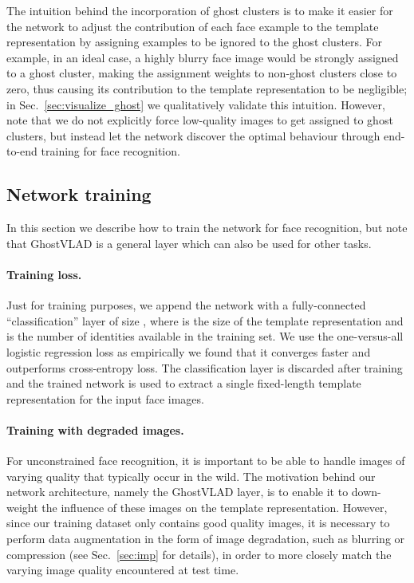 \documentclass[runningheads]{llncs}
\begin{document}
The intuition behind the incorporation of ghost clusters is to
make it easier for the network to adjust
the contribution of each face example to the template representation
by assigning examples to be ignored to the ghost clusters.
For example, in an ideal case, a highly blurry face image
would be strongly assigned to a ghost cluster,
making the assignment weights to non-ghost clusters close to zero,
thus causing its contribution to the template representation
to be negligible;
in Sec.~\ref{sec:visualize_ghost} we qualitatively
validate this intuition.
However, note that we do not explicitly force low-quality images to
get assigned to ghost clusters, but instead let the network discover
the optimal behaviour through end-to-end training for face recognition.







\subsection{Network training}
\label{sec:train}
In this section we describe how to train the network for
face recognition, but note that GhostVLAD is a general layer which can
also be used for other tasks.

\paragraph{Training loss.}
Just for training purposes, we append the network with a fully-connected
``classification'' layer of size , where  is the size
of the template representation and  is the number of identities
available in the training set.
We use the one-versus-all logistic regression loss as empirically
we found that it converges faster and
outperforms cross-entropy loss.
The classification layer is discarded after training and the trained network
is used to extract a single fixed-length template representation
for the input face images.





\paragraph{Training with degraded images.}
For unconstrained face recognition, it is important to be able to handle
images of varying quality that typically occur in the wild.
The motivation behind our network architecture, namely the GhostVLAD layer,
is to enable it to down-weight the influence
of these images on the template representation.
However, since our training dataset only contains good quality images,
it is necessary to perform data augmentation in the form of image degradation,
such as blurring or compression (see Sec.~\ref{sec:imp} for details),
in order to more closely match the varying image quality encountered
at test time.
\end{document}
